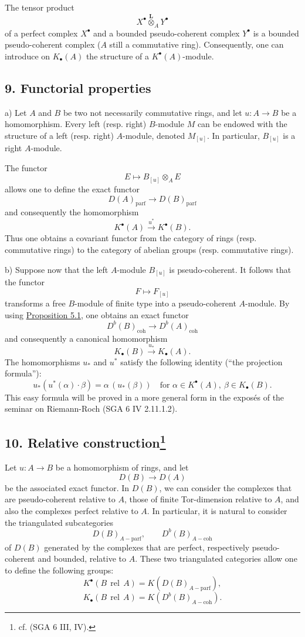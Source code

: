 \documentclass[11pt]{article}
\providecommand{\parf}{\mathrm{parf}}
\providecommand{\coh}{\mathrm{coh}}
\providecommand{\parf}{\mathrm{parf}}
\providecommand{\coh}{\mathrm{coh}}
\begin{document}
The tensor product
\[
X^\bullet\overset{\mathbf L}{\otimes}_A Y^\bullet
\]
of a perfect complex $X^\bullet$ and a bounded pseudo-coherent complex $Y^\bullet$ is a bounded pseudo-coherent complex ($A$ still a commutative ring). Consequently, one can introduce on $K_\bullet(A)$ the structure of a $K^\bullet(A)$-module.

\subsection*{9. Functorial properties}\label{sga5:VIII:subsection:9}

a) Let $A$ and $B$ be two not necessarily commutative rings, and let $u:A\to B$ be a homomorphism. Every left (resp. right) $B$-module $M$ can be endowed with the structure of a left (resp. right) $A$-module, denoted $M_{[u]}$. In particular, $B_{[u]}$ is a right $A$-module.

The functor
\[
E\longmapsto B_{[u]}\otimes_A E
\]
allows one to define the exact functor
\[
D(A)_{\parf}\longrightarrow D(B)_{\parf}
\]
and consequently the homomorphism
\[
K^\bullet(A)\xrightarrow{u^*}K^\bullet(B).
\]
Thus one obtains a covariant functor from the category of rings (resp. commutative rings) to the category of abelian groups (resp. commutative rings).

b) Suppose now that the left $A$-module $B_{[u]}$ is pseudo-coherent. It follows that the functor
\[
F\longmapsto F_{[u]}
\]
transforms a free $B$-module of finite type into a pseudo-coherent $A$-module. By using \hyperref[sga5:VIII:proposition:5.1]{Proposition 5.1}, one obtains an exact functor
\[
D^b(B)_{\coh}\longrightarrow D^b(A)_{\coh}
\]
and consequently a canonical homomorphism
\[
K_\bullet(B)\xrightarrow{u_*}K_\bullet(A).
\]
The homomorphisms $u_*$ and $u^*$ satisfy the following identity (``the projection formula''):
\[
u_*(u^*(\alpha)\cdot \beta)=\alpha\,(u_*(\beta))
\quad\text{for }\alpha\in K^\bullet(A),\ \beta\in K_\bullet(B).
\]
This easy formula will be proved in a more general form in the exposés of the seminar on Riemann-Roch (SGA 6 IV 2.11.1.2).

\subsection*{10. Relative construction\footnote{cf. (SGA 6 III, IV).}}\label{sga5:VIII:subsection:10}

Let $u:A\to B$ be a homomorphism of rings, and let
\[
D(B)\longrightarrow D(A)
\]
be the associated exact functor. In $D(B)$, we can consider the complexes that are pseudo-coherent relative to $A$, those of finite Tor-dimension relative to $A$, and also the complexes perfect relative to $A$. In particular, it is natural to consider the triangulated subcategories
\[
D(B)_{A-\parf},\qquad D^b(B)_{A-\coh}
\]
of $D(B)$ generated by the complexes that are perfect, respectively pseudo-coherent and bounded, relative to $A$. These two triangulated categories allow one to define the following groups:
\[
K^\bullet(B\operatorname{\,rel\,}A)=K(D(B)_{A-\parf}),
\]
\[
K_\bullet(B\operatorname{\,rel\,}A)=K(D^b(B)_{A-\coh}).
\]
\end{document}

